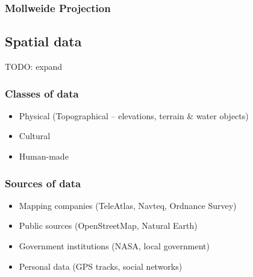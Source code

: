 \documentclass[17pt]{beamer}
\begin{document}
\begin{frame}
  \frametitle{Mollweide Projection}
\end{frame}

\subsection{Spatial data}

TODO: expand

\begin{frame}
  \frametitle{Classes of data}
  \begin{itemize}
  \item Physical (Topographical -- elevations, terrain \& water objects)
  \item Cultural
  \item Human-made
  \end{itemize}
\end{frame}

\begin{frame}
  \frametitle{Sources of data}
  \begin{itemize}
  \item Mapping companies (TeleAtlas, Navteq, Ordnance Survey)
  \item Public sources (OpenStreetMap, Natural Earth)
  \item Government institutions (NASA, local government)
  \item Personal data (GPS tracks, social networks)
  \end{itemize}
\end{frame}
\end{document}
